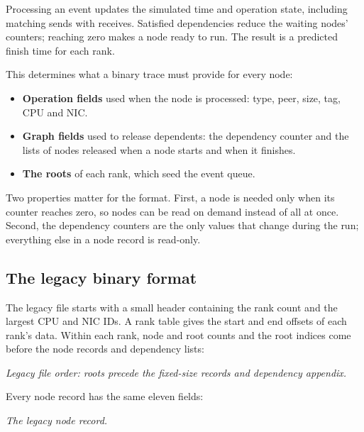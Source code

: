 \documentclass[10pt,a4paper]{article}
\begin{document}
Processing an event updates the simulated time and operation state, including matching sends with receives. Satisfied dependencies reduce the waiting nodes' counters; reaching zero makes a node ready to run. The result is a predicted finish time for each rank.

This determines what a binary trace must provide for every node:

\begin{itemize}
\item \textbf{Operation fields} used when the node is processed: type, peer, size, tag, CPU and NIC.
\item \textbf{Graph fields} used to release dependents: the dependency counter and the lists of nodes released when a node starts and when it finishes.
\item \textbf{The roots} of each rank, which seed the event queue.
\end{itemize}

Two properties matter for the format. First, a node is needed only when its counter reaches zero, so nodes can be read on demand instead of all at once. Second, the dependency counters are the only values that change during the run; everything else in a node record is read-only.

\hypertarget{the-legacy-binary-format}{}
\subsection{The legacy binary format}

The legacy file starts with a small header containing the rank count and the largest CPU and NIC IDs. A rank table gives the start and end offsets of each rank's data. Within each rank, node and root counts and the root indices come before the node records and dependency lists:

\begin{center}
\resizebox{\linewidth}{!}{}
\par\nopagebreak\small\itshape Legacy file order: roots precede the fixed-size records and dependency appendix.
\end{center}

Every node record has the same eleven fields:

\begin{center}
\resizebox{\linewidth}{!}{}
\par\nopagebreak\small\itshape The legacy node record.
\end{center}
\end{document}
